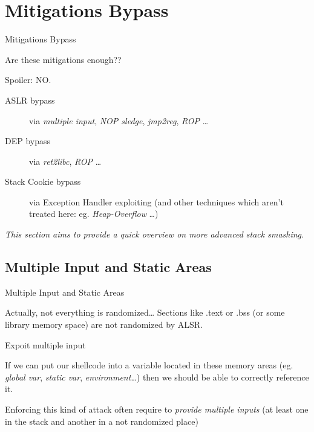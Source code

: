 \section{Mitigations Bypass}
\begin{frame}{Mitigations Bypass}

	\begin{center}\huge
	Are these mitigations enough??
	\end{center}
	
	\begin{block}{Spoiler: NO.}
	\begin{description}
	\item[ASLR bypass] via \emph{multiple input}, \emph{NOP sledge}, \emph{jmp2reg}, \emph{ROP} \ldots
	\item[DEP bypass] via \emph{ret2libc}, \emph{ROP} \ldots
	\item[Stack Cookie bypass] via Exception Handler exploiting (and other techniques which aren't treated here: eg. \emph{Heap-Overflow} \ldots)  
	\end{description}
	\end{block}
	
	\begin{center}
	\emph{This section aims to provide a quick overview on more advanced stack smashing.}
	\end{center}
	
\end{frame}

\subsection{Multiple Input and Static Areas}
\begin{frame}{Multiple Input and Static Areas}

	\begin{block}{Actually, not everything is randomized\ldots}
	Sections like .text or .bss (or some library memory space) are not randomized by ALSR.
	\end{block}
	
	\begin{block}{Expoit multiple input}
	\begin{list}{}{}
	\item If we can put our shellcode into a variable located in these memory areas (eg. \emph{global var}, \emph{static var}, \emph{environment}\ldots) then we should be able to correctly reference it.
	\item Enforcing this kind of attack often require to \emph{provide multiple inputs} (at least one in the stack and another in a not randomized place)
	\end{list}
	\end{block}
	
\end{frame}

